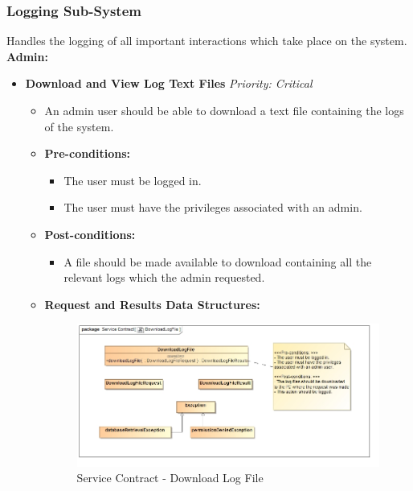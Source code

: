 \documentclass{article}
\begin{document}
				\cleardoublepage
				\subsubsection{Logging Sub-System}\label{subsubsec:logging}
				Handles the logging of all important interactions which take place on the system.\\
				[3mm]
				\textbf{Admin:}
				\begin{itemize}
					\item \textbf{Download and View Log Text Files} \hfill \textit{Priority: Critical}
					\begin{itemize}
						\item An admin user should be able to download a text file containing the logs of the system.
						\item \textbf{Pre-conditions:}
						\begin{itemize}
							\item The user must be logged in.
							\item The user must have the privileges associated with an admin.
						\end{itemize}
						\item \textbf{Post-conditions:}
						\begin{itemize}
							\item A file should be made available to download containing all the relevant logs which the admin requested.
						\end{itemize}
						\item \textbf{Request and Results Data Structures:}
						\begin{figure}[H]
							\includegraphics[width=\linewidth]{../Diagrams/ServiceContracts/Logging subsystem/DownloadLogFile.jpg}
							\caption{Service Contract - Download Log File}
						\end{figure}
					\end{itemize}
				\end{itemize}
\end{document}
